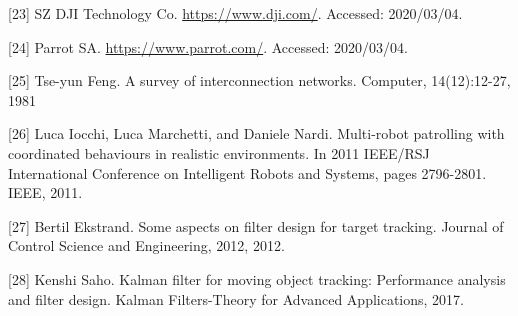 \documentclass[conference]{IEEEtran}
\begin{document}
[23] SZ DJI Technology Co. \href{https://www.dji.com/}{https://www.dji.com/}. Accessed: 2020/03/04.

[24] Parrot SA. \href{https://www.parrot.com/}{https://www.parrot.com/}. Accessed: 2020/03/04.

[25] Tse-yun Feng. A survey of interconnection networks. Computer, 14(12):12-27, 1981

[26] Luca Iocchi, Luca Marchetti, and Daniele Nardi. Multi-robot patrolling with coordinated behaviours in realistic environments. In 2011 IEEE/RSJ International Conference on Intelligent Robots and Systems, pages 2796-2801. IEEE, 2011.

[27] Bertil Ekstrand. Some aspects on filter design for target tracking. Journal of Control Science and Engineering, 2012, 2012.

[28] Kenshi Saho. Kalman filter for moving object tracking: Performance analysis and filter design. Kalman Filters-Theory for Advanced Applications, 2017.
\end{document}
